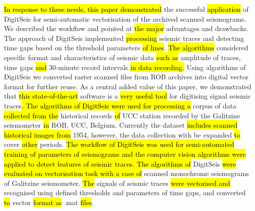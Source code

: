 \documentclass[sensors,article,submit,moreauthors,pdftex]{Definitions/mdpi}
\begin{document}
\hl{In response to these needs, this paper demonstrated }the successful \hl{application } of DigitSeis for semi-automatic vectorisation of the archived scanned seismograms. We described the workflow and pointed at \hl{the major }advantages and drawbacks. The approach of DigitSeis implemented\hl{ processing }seismic traces and detecting time gaps based on the threshold parameters\hl{ of lines}. \hl{The algorithms }considered specific format and characteristics of seismic data\hl{ such as }amplitude of traces, time gaps\hl{ and }30-minute record intervals\hl{ in data recording. }Using algorithms of DigitSeis we converted raster scanned files from ROB archives into digital vector format for further reuse. As a central added value of this paper, we demonstrated that \hl{this  state-of-the-art} software is a \hl{very useful tool} for digitising signal seismic traces\hl{. The algorithms of DigitSeis were used for processing a }corpus of data\hl{ collected from the }historical records \hl{of }\ac{UCC} station recorded by the Galitzine seismometer \hl{ in} \ac{ROB}, \ac{UCC}, Belgium. Currently the dataset \hl{includes scanned historical images from }1954, however, the data collection with be expanded\hl{ to }cover \hl{other }periods.\hl{ The workflow of DigitSeis was used for semi-automated training of parameters of seismograms and the computer vision algorithms were applied to detect features of seismic traces. The algorithms of }DigitSeis \hl{were evaluated on vectorisation task with a case of }scanned monochrome seismograms of Galitzine seismometer.\hl{ The }signals of seismic traces \hl{were vectorised and }recognised using defined thresholds and parameters of time gaps, and\hl{ }converted \hl{to }vector\hl{ format as }.mat \hl{files}. 
\end{document}
